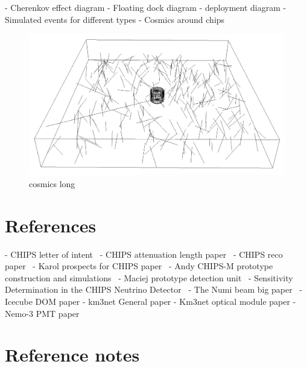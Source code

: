 - Cherenkov effect diagram
- Floating dock diagram
- deployment diagram
- Simulated events for different types
- Cosmics around chips
\begin{figure}
    \includegraphics[width=\textwidth]{diagrams/4-chips/cosmics.png}
    \caption[cosmics short]{cosmics long}
    \label{fig:cosmics}
\end{figure}


\section{References}


- CHIPS letter of intent~\cite{adamson2013}
- CHIPS attenuation length paper~\cite{amat2017}
- CHIPS reco paper~\cite{blake2016}
- Karol prospects for CHIPS paper~\cite{lang2015}
- Andy CHIPS-M prototype construction and simulations~\cite{perch2015}
- Maciej prototype detection unit~\cite{pfutznerProto2017}
- Sensitivity Determination in the CHIPS Neutrino Detector~\cite{adde2016}
- The Numi beam big paper~\cite{adamson2016}
- Icecube DOM paper
- km3net General paper
- Km3net optical module paper
- Nemo-3 PMT paper


\section{Reference notes}

